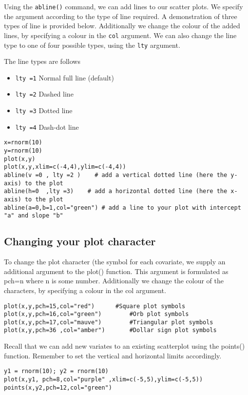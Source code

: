 \documentclass[a4paper,12pt]{article}
\begin{document}
\begin{itemize}
Using the \texttt{abline()} command, we can add lines to our scatter plots. We specify the argument according to the type of line required. A demonstration of three types of line is provided below.
Additionally we change the colour of the added lines, by specifying a colour in the \texttt{col} argument. We can also change the line type to one of four possible types, using the \texttt{lty} argument.

The line types are follows
\begin{itemize}
\item	\texttt{lty =1}   Normal full line (default)
\item	\texttt{lty =2}   Dashed line
\item	\texttt{lty =3}   Dotted line
\item	\texttt{lty =4}   Dash-dot line
\end{itemize}
\footnotesize \begin{verbatim}
x=rnorm(10)
y=rnorm(10)
plot(x,y)
plot(x,y,xlim=c(-4,4),ylim=c(-4,4))
abline(v =0 , lty =2 )    # add a vertical dotted line (here the y-axis) to the plot
abline(h=0  ,lty =3)    # add a horizontal dotted line (here the x-axis) to the plot
abline(a=0,b=1,col="green") # add a line to your plot with intercept "a" and slope "b"
 \end{verbatim}\normalsize

\subsection{Changing your plot character}

To change the plot character (the symbol for each covariate, we supply an additional argument to the plot() function.  This argument is formulated as pch=n where n is some number.
Additionally we change the colour of the characters, by specifying a colour in the col argument.
\footnotesize \begin{verbatim}
plot(x,y,pch=15,col="red")		#Square plot symbols
plot(x,y,pch=16,col="green")		#Orb plot symbols
plot(x,y,pch=17,col="mauve")		#Triangular plot symbols
plot(x,y,pch=36	,col="amber")		#Dollar sign plot symbols
\end{verbatim}\normalsize
Recall that we can add new variates to an existing scatterplot using the points() function. Remember to set the vertical and horizontal limits accordingly.
\footnotesize \begin{verbatim}
y1 = rnorm(10); y2 = rnorm(10)
plot(x,y1, pch=8,col="purple" ,xlim=c(-5,5),ylim=c(-5,5))
points(x,y2,pch=12,col="green")
\end{verbatim}\normalsize

\end{itemize}
\end{document}
